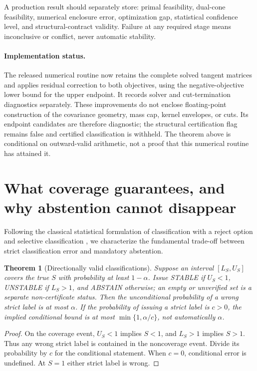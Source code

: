 \documentclass[11pt,a4paper]{article}
\newtheorem{theorem}{Theorem}[section]
\theoremstyle{definition}\newtheorem{definition}[theorem]{Definition}
\theoremstyle{remark}\newtheorem{remark}[theorem]{Remark}
\begin{document}
A production result should separately store: primal feasibility, dual-cone feasibility, numerical enclosure error, optimization gap, statistical confidence level, and structural-contract validity. Failure at any required stage means inconclusive or conflict, never automatic stability.

\paragraph{Implementation status.}
The released numerical routine now retains the complete solved tangent matrices and applies residual correction to both objectives, using the negative-objective lower bound for the upper endpoint. It records solver and cut-termination diagnostics separately. These improvements do not enclose floating-point construction of the covariance geometry, mass cap, kernel envelopes, or cuts. Its endpoint candidates are therefore diagnostic; the structural certification flag remains false and certified classification is withheld. The theorem above is conditional on outward-valid arithmetic, not a proof that this numerical routine has attained it.

\section{What coverage guarantees, and why abstention cannot disappear}
Following the classical statistical formulation of classification with a reject option and selective classification \cite{chow1970,herbei2006,geifman2017}, we characterize the fundamental trade-off between strict classification error and mandatory abstention.
\begin{theorem}[Directionally valid classifications]\label{thm:decision}
Suppose an interval $[L_S,U_S]$ covers the true $S$ with probability at least $1-\alpha$. Issue STABLE if $U_S<1$, UNSTABLE if $L_S>1$, and ABSTAIN otherwise; an empty or unverified set is a separate non-certificate status. Then the unconditional probability of a wrong strict label is at most $\alpha$.
If the probability of issuing a strict label is $c>0$, the implied conditional bound is at most $\min\{1,\alpha/c\}$, not automatically $\alpha$.
\end{theorem}
\begin{proof}
On the coverage event, $U_S<1$ implies $S<1$, and $L_S>1$ implies $S>1$. Thus any wrong strict label is contained in the noncoverage event. Divide its probability by $c$ for the conditional statement. When $c=0$, conditional error is undefined. At $S=1$ either strict label is wrong.
\end{proof}
\end{document}
